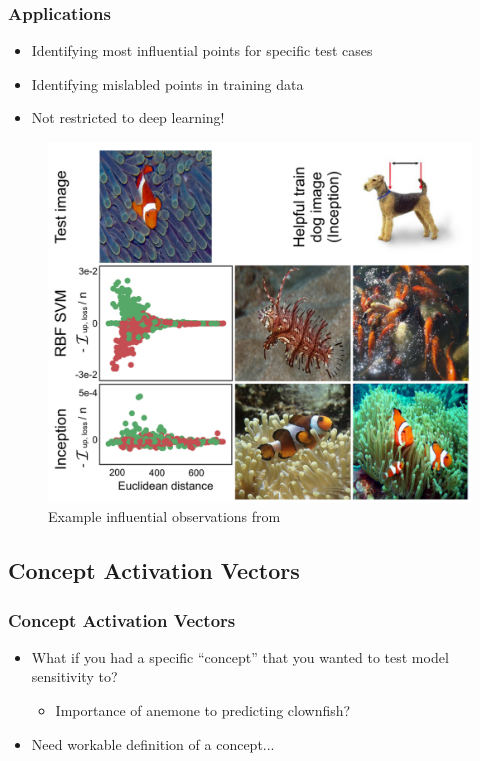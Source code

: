 \documentclass[10pt,mathserif]{beamer}
\begin{document}
\begin{frame}
  \frametitle{Applications}
  \begin{itemize}
  \item Identifying most influential points for specific test cases
  \item Identifying mislabled points in training data
  \item Not restricted to deep learning!
  \end{itemize} 
\begin{figure}[ht]
  \centering
  \includegraphics[width=0.45\paperwidth]{figure/influential}
  \caption{Example influential observations from \citep{koh2017understanding}\label{fig:influential}
  }
\end{figure}
\end{frame}

\subsection{Concept Activation Vectors}

\begin{frame}
  \frametitle{Concept Activation Vectors}
  \begin{itemize}
  \item What if you had a specific ``concept'' that you wanted to test model
    sensitivity to?
    \begin{itemize}
    \item Importance of anemone to predicting clownfish?
    \end{itemize}
  \item Need workable definition of a concept...
  \end{itemize}
\end{frame}
\end{document}
